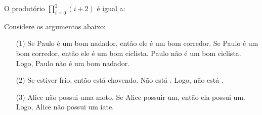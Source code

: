 \documentclass[16pt]{examdesign}
\begin{document}
 
 
\begin{multiplechoice}[title={Questões de múltipla escolha (3 pontos cada) },rearrange=no, resetcounter=no,suppressprefix,examcolumns=2,keycolumns=2]
%  

  \begin{question}
	  O produtório $\prod_{i=0}^{2} {(i+2)}$ é igual a:
		
  \end{question}

	\begin{question}
	 Considere os argumentos abaixo:  
		  \begin{itemize}
	   \item[(1) ] Se Paulo é um bom nadador, então ele é um bom corredor.
	   Se Paulo é um bom corredor, então ele é um bom ciclista. Paulo não é um bom ciclista. Logo, Paulo não é um bom nadador. %
	   \item[(2) ] Se estiver frio, então está chovendo. Não está . Logo, não está .%
	   \item[(3) ] Alice não possui uma moto. Se Alice possuir um, então ela possui um. 
	   Logo, Alice não possui um iate. %
	  \end{itemize}
	

\end{question}
\end{multiplechoice}
\end{document}
